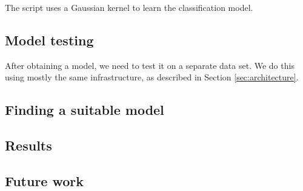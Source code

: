 \documentclass[a4paper,12pt]{article}
\begin{document}
The script uses a Gaussian kernel to learn the classification model.

\subsection*{Model testing}

After obtaining a model, we need to test it on a separate data set. We do this
using mostly the same infrastructure, as described in Section
\ref{sec:architecture}.

\subsection*{Finding a suitable model}

\subsection*{Results}

\subsection*{Future work}

\vskip 0.2in


\end{document}
